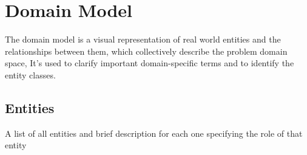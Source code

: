\documentclass[]{uc2pfecaneva}
\begin{document}
    \raggedright\section{Domain Model}
    The domain model is a visual representation of real world entities and the relationships between them, which collectively describe the problem domain space, It's used to clarify important domain-specific terms and to identify the entity classes.
    \raggedright\subsection{Entities}
    A list of all entities and brief description for each one specifying the role of that entity\linebreak \\
    \begin{table}[h]



\end{table}
\end{document}
